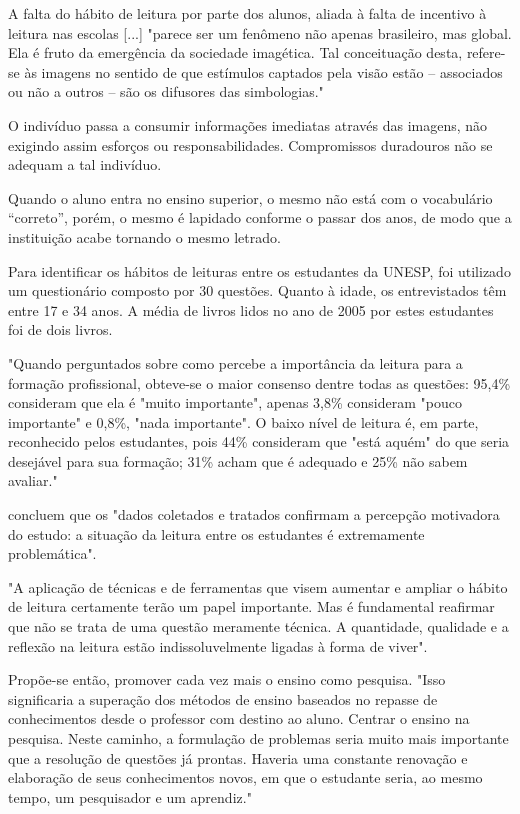 \documentclass[
	article,			%
	11pt,				%
	oneside,			%
	a4paper,			%
	english,			%
	brazil,				%
	sumario=tradicional
	]{abntex2}
\begin{document}
A falta do hábito de leitura por parte dos alunos, aliada à falta de incentivo à leitura nas escolas [...] "parece ser um fenômeno não apenas brasileiro, mas global. Ela é fruto da emergência da sociedade imagética. Tal conceituação desta, refere-se às imagens no sentido de que estímulos captados pela visão estão – associados ou não a outros – são os difusores das simbologias." \cite[p.9.132]{habitosleit}

O indivíduo passa a consumir informações imediatas através das imagens, não exigindo assim esforços ou responsabilidades. Compromissos duradouros não se adequam a tal indivíduo.

Quando o aluno entra no ensino superior, o mesmo não está com o vocabulário “correto”, porém, o mesmo é lapidado conforme o passar dos anos, de modo que a instituição acabe tornando o mesmo letrado. \cite{FichamentoBili}

Para identificar os hábitos de leituras entre os estudantes da UNESP, foi utilizado um questionário composto por 30 questões.
Quanto à idade, os entrevistados têm entre 17 e 34 anos. A média de livros lidos no ano de 2005 por estes estudantes foi de dois livros. 

"Quando perguntados sobre como percebe a importância da leitura para a formação profissional, obteve-se o maior consenso dentre todas as questões: 95,4\% consideram que ela é "muito importante", apenas 3,8\% consideram "pouco importante" e 0,8\%, "nada importante". O baixo nível de leitura é, em parte, reconhecido pelos estudantes, pois 44\% consideram que "está aquém" do que seria desejável para sua formação; 31\% acham que é adequado e 25\% não sabem avaliar." \cite[p.9.141]{habitosleit}

 concluem que os "dados coletados e tratados confirmam a percepção motivadora do estudo: a situação da leitura entre os estudantes é extremamente problemática".

"A aplicação de técnicas e de ferramentas que visem aumentar e ampliar o hábito de leitura certamente terão um papel importante. Mas é fundamental reafirmar que não se trata de uma questão meramente técnica. A quantidade, qualidade e a reflexão na leitura estão indissoluvelmente ligadas à forma de viver". \cite[p.9.143]{habitosleit}

Propõe-se então, promover cada vez mais o ensino como pesquisa. "Isso significaria a superação dos métodos de ensino baseados no repasse de conhecimentos desde o professor com destino ao aluno. Centrar o ensino na pesquisa. Neste caminho, a formulação de problemas seria muito mais importante que a resolução de questões já prontas. Haveria uma constante renovação e elaboração de seus conhecimentos novos, em que o estudante seria, ao mesmo tempo, um pesquisador e um aprendiz." \cite[p.9.143]{habitosleit}
\end{document}

